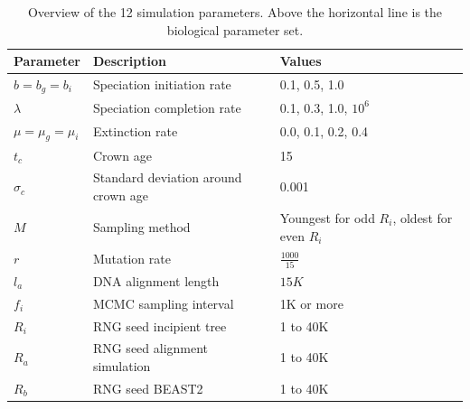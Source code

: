 \documentclass{article}
\begin{document}
\begin{table}
  \centering 
  \begin{tabular}{l l l}
    \hline
    Parameter             & Description & Values \\
    \hline
    \hline
    $b = b_g = b_i$       & Speciation initiation rate & 0.1, 0.5, 1.0 \\
    $\lambda$             & Speciation completion rate & 0.1, 0.3, 1.0, $10^6$ \\
    $\mu = \mu_g = \mu_i$ & Extinction rate & 0.0, 0.1, 0.2, 0.4 \\
    \hline
    $t_c$                 & Crown age & 15 \\
    $\sigma_c$            & Standard deviation around crown age & 0.001 \\
    $M$                   & Sampling method & Youngest for odd $R_i$, oldest for even $R_i$ \\
    $r$                   & Mutation rate & $\frac{1000}{15}$ \\
    $l_a$                 & DNA alignment length & $15K$ \\
    $f_i$                 & MCMC sampling interval & 1K or more \\
    $R_i$                 & RNG seed incipient tree & 1 to 40K \\
    $R_a$                 & RNG seed alignment simulation & 1 to 40K \\
    $R_b$                 & RNG seed BEAST2 & 1 to 40K \\
    \hline
  \end{tabular}
  \caption{
    Overview of the 12 simulation parameters. Above the horizontal line is 
    the biological parameter set.
  }
  \label{table:simulation_parameters}
\end{table}
\end{document}

